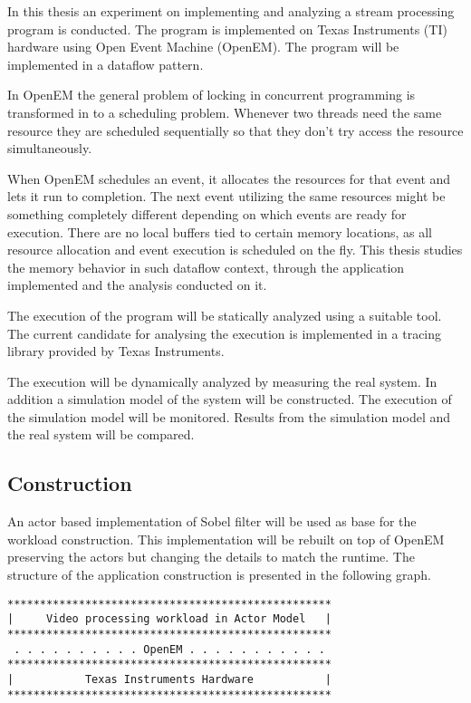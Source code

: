 In this thesis an experiment on implementing and analyzing a stream processing program is conducted. The program is implemented on Texas Instruments (TI) hardware using Open Event Machine (OpenEM). The program will be implemented in a dataflow pattern.

In OpenEM the general problem of locking in concurrent programming is transformed in to a scheduling problem. Whenever two threads need the same resource they are scheduled sequentially so that they don't try access the resource simultaneously.

When OpenEM schedules an event, it allocates the resources for that event and lets it run to completion. The next event utilizing the same resources might be something completely different depending on which events are ready for execution. There are no local buffers tied to certain memory locations, as all resource allocation and event execution is scheduled on the fly. This thesis studies the memory behavior in such dataflow context, through the application implemented and the analysis conducted on it. 

The execution of the program will be statically analyzed using a suitable tool. The current candidate for analysing the execution is implemented in a tracing library provided by Texas Instruments.

The execution will be dynamically analyzed by measuring the real system. In addition a simulation model of the system will be constructed. The execution of the simulation model will be monitored. Results from the simulation model and the real system will be compared.

\subsection{Construction}
An actor based implementation of Sobel filter will be used as base for the workload construction. This implementation will be rebuilt on top of OpenEM preserving the actors but changing the details to match the runtime. The structure of the application construction is presented in the following graph.

\begin{samepage}
\begin{verbatim}
**************************************************
|     Video processing workload in Actor Model   |
**************************************************
 . . . . . . . . . . OpenEM . . . . . . . . . . .
**************************************************
|           Texas Instruments Hardware           |
**************************************************
\end{verbatim}
\end{samepage}

